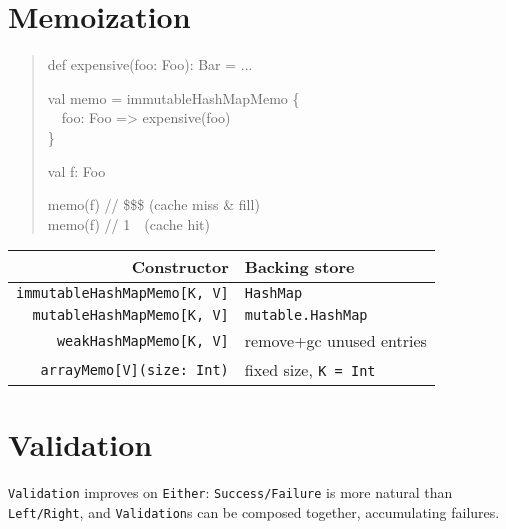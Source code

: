 \documentclass{tufte-handout}
\begin{document}
\section{Memoization}\label{sec:memoization}

\begin{quote}
  \ttfamily 
  def expensive(foo: Foo): Bar = ... 
    
  val memo = immutableHashMapMemo \{ \\
 \ \ foo: Foo => expensive(foo) \\
    \} 
    
  val f: Foo 
    
  memo(f) // \$\$\$ (cache miss \& fill) \\
  memo(f) // 1\textcent\ \  (cache hit) 
\end{quote}

\begin{table}[ht]
  \centering
  \selectfont
  \begin{tabular}{rl}
    \toprule
    Constructor & Backing store \\
    \midrule
    \texttt{immutableHashMapMemo[K, V]} & \texttt{HashMap} \\ 
    \texttt{mutableHashMapMemo[K, V]} & \texttt{mutable.HashMap} \\
    \texttt{weakHashMapMemo[K, V]} & remove+gc unused entries \\
    \texttt{arrayMemo[V](size: Int)} & fixed size, \texttt{K = Int} \\
    \bottomrule
  \end{tabular}
  \label{tab:normaltab}
\end{table}

\pagebreak

\section{Validation}\label{sec:validation}

\texttt{Validation} improves on \texttt{Either}: \texttt{Success/Failure} is more natural than \texttt{Left/Right}, and \texttt{Validation}s can be composed together, accumulating failures.
\end{document}

